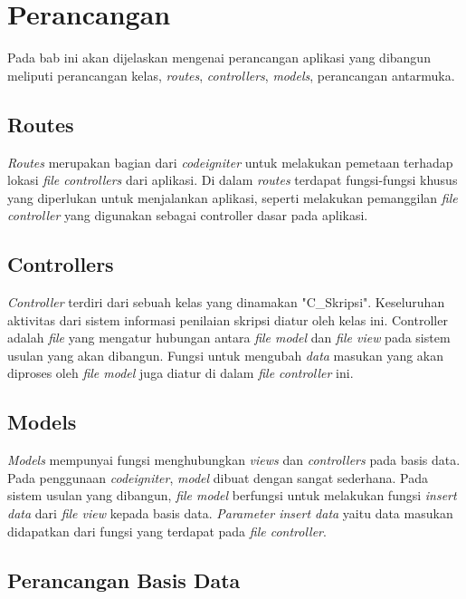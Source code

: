 \chapter{Perancangan}
\label{chap: perancangan}
	
	Pada bab ini akan dijelaskan mengenai perancangan aplikasi yang dibangun meliputi perancangan kelas, \textit{routes}, \textit{controllers}, \textit{models}, perancangan antarmuka.
	
	\section{Routes}
	\label{sec: routes}
	
	\textit{Routes} merupakan bagian dari \textit{codeigniter} untuk melakukan pemetaan terhadap lokasi \textit{file controllers} dari aplikasi. Di dalam \textit{routes} terdapat fungsi-fungsi khusus yang diperlukan untuk menjalankan aplikasi, seperti melakukan pemanggilan \textit{file controller} yang digunakan sebagai controller dasar pada aplikasi.

	\section{Controllers}
	\label{sec: controllers}
	
	\textit{Controller} terdiri dari sebuah kelas yang dinamakan "C\_Skripsi". Keseluruhan aktivitas dari sistem informasi penilaian skripsi diatur oleh kelas ini. Controller adalah \textit{file} yang mengatur hubungan antara \textit{file model} dan \textit{file view} pada sistem usulan yang akan dibangun. Fungsi untuk mengubah \textit{data} masukan yang akan diproses oleh \textit{file model} juga diatur di dalam \textit{file controller} ini.
	
	
	\section{Models}
	\label{sec: models}
	
	\textit{Models} mempunyai fungsi menghubungkan \textit{views} dan \textit{controllers} pada basis data. Pada penggunaan \textit{codeigniter}, \textit{model} dibuat dengan sangat sederhana. Pada sistem usulan yang dibangun, \textit{file model} berfungsi untuk melakukan fungsi \textit{insert data} dari \textit{file view} kepada basis data. \textit{Parameter insert data} yaitu data masukan didapatkan dari fungsi yang terdapat pada \textit{file controller}.
	
	\section{Perancangan Basis Data}
	\label{sec: perancanganDatabase}
	
